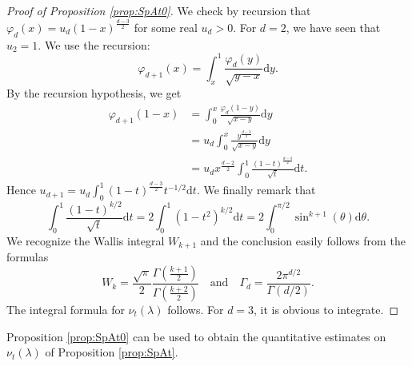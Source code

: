 \documentclass[]{scrartcl}
\renewcommand{\d}{\mathrm{d}}
\numberwithin{equation}{section}
\numberwithin{figure}{section}
\begin{document}
\begin{proof}[Proof of Proposition \ref{prop:SpAt0}]
	We check by recursion that $\varphi_{d} (x) = u_d (1-x)^{\frac{d-3}{2}}$ for some real $u_d >0$. For $d=2$, we have seen that $u_2= 1$. We use the recursion: 
	$$
	\varphi_{d+1} (x) = \int_{x}^1 \frac{\varphi_{d} (y)}{\sqrt{y - x}} \d y. 
	$$
	By the recursion hypothesis, we get
	\begin{align*}
		\varphi_{d+1} (1-x) & = \int_{0}^{x} \frac{\varphi_{d} (1-y)}{\sqrt{x-y}} \d y \\
		&  = u_d  \int_{0}^{x} \frac{y^{\frac{d-3}{2}}}{\sqrt{x-y}} \d y \\
		& = u_d  x^{\frac{d-2}{2}} \int_{0}^{1} \frac{(1-t)^{\frac{d-3}{2}}}{\sqrt{t}} \d t.  
	\end{align*}
	Hence $u_{d+1} = u_{d} \int_0^{1} (1-t)^{\frac{d-3}2} t^{-1/2} \d t $. We finally remark that 
	$$
	\int_{0}^{1} \frac{(1-t)^{k/2}}{\sqrt{t}} \d t = 2 \int_{0}^{1} (1-t^2)^{k/2} \d t = 2 \int_{0}^{\pi/2} \sin^{k+1} (\theta) \d\theta .
	$$
	We recognize the Wallis integral $W_{k+1}$ and the conclusion easily follows from the formulas \[W_k = \frac{\sqrt{\pi}}{2} \frac{\Gamma\left(\frac{k+1}{2}\right)}{\Gamma \left(\frac{k+2}{2}\right)} \quad \text{and} \quad \Gamma_d = \frac{2 \pi^{d/2}}{ \Gamma\left(d/2\right)}.\] The integral formula for $\nu_t(\lambda)$ follows. For $d=3$, it is obvious to integrate. \end{proof}


Proposition \ref{prop:SpAt0} can be used to obtain the quantitative estimates on $\nu_t(\lambda)$ of Proposition \ref{prop:SpAt}.
\end{document}
